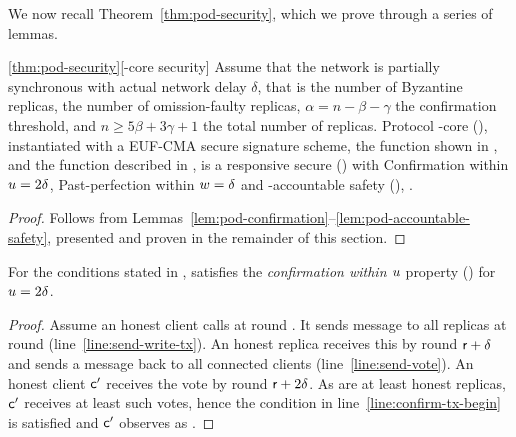 
\noindent

We now recall Theorem~\ref{thm:pod-security}, which we prove through a series of lemmas.

\begin{customthm}{\ref{thm:pod-security}}[\podtm-core security]
	Assume that the network is partially synchronous with actual network delay $\delta$, that \beta is the number of Byzantine replicas, \gamma the number of omission-faulty replicas, $\alpha = n - \beta - \gamma$ the confirmation threshold, and $n \geq 5 \beta + 3 \gamma + 1$ the total number of replicas. Protocol \podtm-core (), instantiated with a EUF-CMA secure signature scheme, the \opValid{} function shown in , and the \identify{} function described in , is a responsive secure \podtm () with Confirmation within $u = 2 \delta$, Past-perfection within $w = \delta$ and  \beta-accountable safety (), \ewnp.
\end{customthm}
\begin{proof}
	Follows from Lemmas~\ref{lem:pod-confirmation}--\ref{lem:pod-accountable-safety}, presented and proven in the remainder of this section.
\end{proof}

\begin{lemma}\label{lem:pod-confirmation}
	For the conditions stated in ,  satisfies the \emph{confirmation within $u$} property () for $u = 2 \delta$.
\end{lemma}
\begin{proof}
	Assume an honest client \client calls \opwrite{\tx} at round \round.
	It sends message \msgwrite{\tx} to all replicas at round \round (line~\ref{line:send-write-tx}).
	An honest replica receives this by round $\textsf{r} + \delta$ and sends a \msgrecord{} message back to all connected clients (line~\ref{line:send-vote}).
	An honest client $\textsf{c}'$ receives the vote by round $\textsf{r} + 2\delta$.
	As are at least \alpha honest replicas, $\textsf{c}'$ receives at least \alpha such votes, hence the condition in line~\ref{line:confirm-tx-begin} is satisfied and $\textsf{c}'$ observes \tx as \confirmed.
\end{proof}

